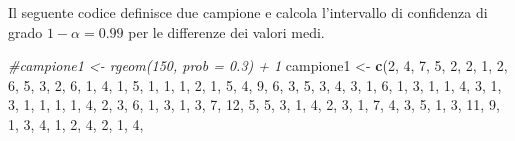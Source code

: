 \documentclass[]{book}
\newenvironment{Shaded}{\begin{snugshade}}{\end{snugshade}}
\newcommand{\KeywordTok}[1]{\textcolor[rgb]{0.13,0.29,0.53}{\textbf{#1}}}
\newcommand{\DecValTok}[1]{\textcolor[rgb]{0.00,0.00,0.81}{#1}}
\newcommand{\StringTok}[1]{\textcolor[rgb]{0.31,0.60,0.02}{#1}}
\newcommand{\CommentTok}[1]{\textcolor[rgb]{0.56,0.35,0.01}{\textit{#1}}}
\newcommand{\NormalTok}[1]{#1}
\begin{document}
Il seguente codice definisce due campione e calcola l'intervallo di
confidenza di grado \(1-\alpha = 0.99\) per le differenze dei valori
medi.

\begin{Shaded}
\begin{Highlighting}[]
\CommentTok{#campione1 <- rgeom(150, prob = 0.3) + 1}
\NormalTok{campione1 <-}\StringTok{ }\KeywordTok{c}\NormalTok{(}\DecValTok{2}\NormalTok{, }\DecValTok{4}\NormalTok{, }\DecValTok{7}\NormalTok{, }\DecValTok{5}\NormalTok{, }\DecValTok{2}\NormalTok{, }\DecValTok{2}\NormalTok{, }\DecValTok{1}\NormalTok{, }\DecValTok{2}\NormalTok{, }\DecValTok{6}\NormalTok{, }\DecValTok{5}\NormalTok{, }\DecValTok{3}\NormalTok{, }\DecValTok{2}\NormalTok{, }\DecValTok{6}\NormalTok{, }\DecValTok{1}\NormalTok{, }\DecValTok{4}\NormalTok{, }\DecValTok{1}\NormalTok{, }\DecValTok{5}\NormalTok{, }\DecValTok{1}\NormalTok{, }\DecValTok{1}\NormalTok{, }\DecValTok{1}\NormalTok{, }
              \DecValTok{2}\NormalTok{, }\DecValTok{1}\NormalTok{, }\DecValTok{5}\NormalTok{, }\DecValTok{4}\NormalTok{, }\DecValTok{9}\NormalTok{, }\DecValTok{6}\NormalTok{, }\DecValTok{3}\NormalTok{, }\DecValTok{5}\NormalTok{, }\DecValTok{3}\NormalTok{, }\DecValTok{4}\NormalTok{, }\DecValTok{3}\NormalTok{, }\DecValTok{1}\NormalTok{, }\DecValTok{6}\NormalTok{, }\DecValTok{1}\NormalTok{, }\DecValTok{3}\NormalTok{, }\DecValTok{1}\NormalTok{, }\DecValTok{1}\NormalTok{, }\DecValTok{4}\NormalTok{, }\DecValTok{3}\NormalTok{, }\DecValTok{1}\NormalTok{, }
              \DecValTok{3}\NormalTok{, }\DecValTok{1}\NormalTok{, }\DecValTok{1}\NormalTok{, }\DecValTok{1}\NormalTok{, }\DecValTok{1}\NormalTok{, }\DecValTok{4}\NormalTok{, }\DecValTok{2}\NormalTok{, }\DecValTok{3}\NormalTok{, }\DecValTok{6}\NormalTok{, }\DecValTok{1}\NormalTok{, }\DecValTok{3}\NormalTok{, }\DecValTok{1}\NormalTok{, }\DecValTok{3}\NormalTok{, }\DecValTok{7}\NormalTok{, }\DecValTok{12}\NormalTok{, }\DecValTok{5}\NormalTok{, }\DecValTok{5}\NormalTok{, }\DecValTok{3}\NormalTok{, }\DecValTok{1}\NormalTok{, }\DecValTok{4}\NormalTok{, }
              \DecValTok{2}\NormalTok{, }\DecValTok{3}\NormalTok{, }\DecValTok{1}\NormalTok{, }\DecValTok{7}\NormalTok{, }\DecValTok{4}\NormalTok{, }\DecValTok{3}\NormalTok{, }\DecValTok{5}\NormalTok{, }\DecValTok{1}\NormalTok{, }\DecValTok{3}\NormalTok{, }\DecValTok{11}\NormalTok{, }\DecValTok{9}\NormalTok{, }\DecValTok{1}\NormalTok{, }\DecValTok{3}\NormalTok{, }\DecValTok{4}\NormalTok{, }\DecValTok{1}\NormalTok{, }\DecValTok{2}\NormalTok{, }\DecValTok{4}\NormalTok{, }\DecValTok{2}\NormalTok{, }\DecValTok{1}\NormalTok{, }\DecValTok{4}\NormalTok{, }

\end{Highlighting}
\end{Shaded}
\end{document}
